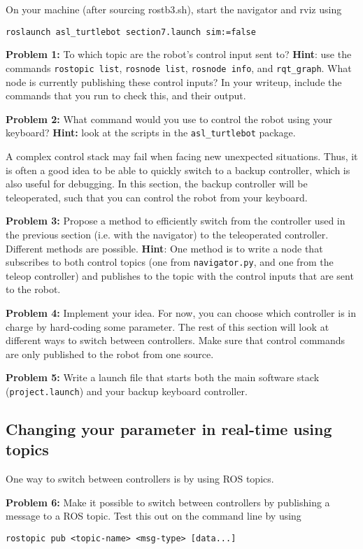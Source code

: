 \documentclass{article}
\begin{document}
On your machine (after sourcing rostb3.sh), start the navigator and rviz using
\begin{lstlisting}
roslaunch asl_turtlebot section7.launch sim:=false
\end{lstlisting}

\textbf{Problem 1: } To which topic are the robot's control input sent to? \textbf{Hint}: use the commands \texttt{rostopic list}, \texttt{rosnode list}, \texttt{rosnode info}, and \texttt{rqt\_graph}. What node is currently publishing these control inputs? In your writeup, include the commands that you run to check this, and their output.

\textbf{Problem 2: } What command would you use to control the robot using your keyboard? \textbf{Hint:} look at the scripts in the \texttt{asl\_turtlebot} package.

A complex control stack may fail when facing new unexpected situations. Thus, it is often a good idea to be able to quickly switch to a backup controller, which is also useful for debugging. In this section, the backup controller will be teleoperated, such that you can control the robot from your keyboard. 

\textbf{Problem 3: } Propose a method to efficiently switch from the controller used in the previous section (i.e. with the navigator) to the teleoperated controller. Different methods are possible.
\textbf{Hint}: One method is to write a node that subscribes to both control topics (one from \texttt{navigator.py}, and one from the teleop controller) and publishes to the topic with the control inputs that are sent to the robot.

\textbf{Problem 4: } Implement your idea. For now, you can choose which controller is in charge by hard-coding some parameter. The rest of this section will look at different ways to switch between controllers. Make sure that control commands are only published to the robot from one source.

\textbf{Problem 5: } Write a launch file that starts both the main software stack (\texttt{project.launch}) and your backup keyboard controller. 

\subsection{Changing your parameter in real-time using topics}
One way to switch between controllers is by using ROS topics.

\textbf{Problem 6: } Make it possible to switch between controllers by publishing a message to a ROS topic. Test this out on the command line by using
\begin{lstlisting}
rostopic pub <topic-name> <msg-type> [data...]
\end{lstlisting}
\end{document}
